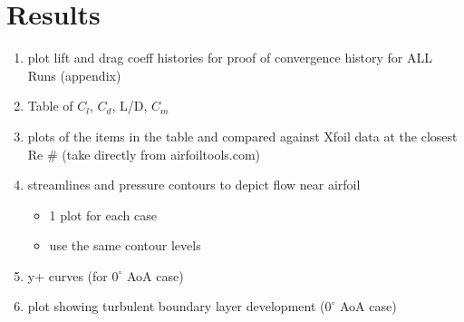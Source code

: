 \section{Results}

\begin{enumerate}
	\item plot lift and drag coeff histories for proof of convergence history for ALL Runs (appendix)
	\item Table of $C_l$, $C_d$, L/D, $C_m$
	\item plots of the items in the table and compared against Xfoil data at the closest Re \# (take directly from airfoiltools.com)
	\item streamlines and pressure contours to depict flow near airfoil
	\begin{itemize}
		\item 1 plot for each case
		\item use the same contour levels
	\end{itemize}
	\item y+ curves (for $0^\circ$ AoA case)
	\item plot showing turbulent boundary layer development ($0^\circ$ AoA case)
\end{enumerate}